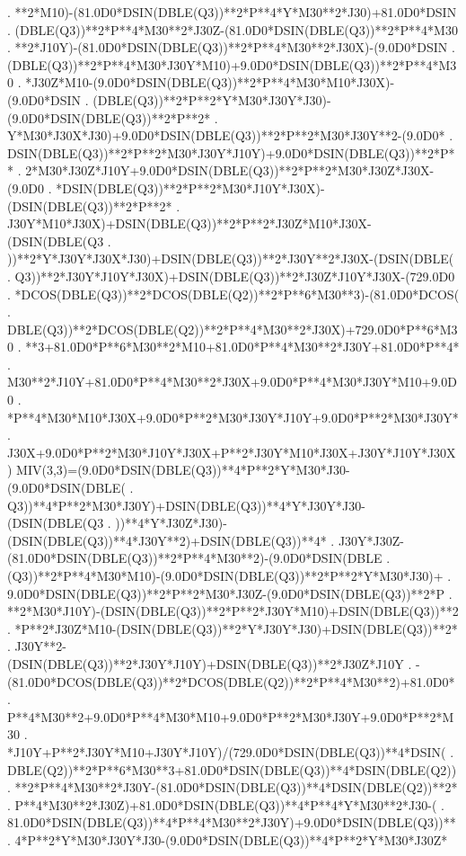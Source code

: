 \begin{framedverbatim}
     . **2*M10)-(81.0D0*DSIN(DBLE(Q3))**2*P**4*Y*M30**2*J30)+81.0D0*DSIN
     . (DBLE(Q3))**2*P**4*M30**2*J30Z-(81.0D0*DSIN(DBLE(Q3))**2*P**4*M30
     . **2*J10Y)-(81.0D0*DSIN(DBLE(Q3))**2*P**4*M30**2*J30X)-(9.0D0*DSIN
     . (DBLE(Q3))**2*P**4*M30*J30Y*M10)+9.0D0*DSIN(DBLE(Q3))**2*P**4*M30
     . *J30Z*M10-(9.0D0*DSIN(DBLE(Q3))**2*P**4*M30*M10*J30X)-(9.0D0*DSIN
     . (DBLE(Q3))**2*P**2*Y*M30*J30Y*J30)-(9.0D0*DSIN(DBLE(Q3))**2*P**2*
     . Y*M30*J30X*J30)+9.0D0*DSIN(DBLE(Q3))**2*P**2*M30*J30Y**2-(9.0D0*
     . DSIN(DBLE(Q3))**2*P**2*M30*J30Y*J10Y)+9.0D0*DSIN(DBLE(Q3))**2*P**
     . 2*M30*J30Z*J10Y+9.0D0*DSIN(DBLE(Q3))**2*P**2*M30*J30Z*J30X-(9.0D0
     . *DSIN(DBLE(Q3))**2*P**2*M30*J10Y*J30X)-(DSIN(DBLE(Q3))**2*P**2*
     . J30Y*M10*J30X)+DSIN(DBLE(Q3))**2*P**2*J30Z*M10*J30X-(DSIN(DBLE(Q3
     . ))**2*Y*J30Y*J30X*J30)+DSIN(DBLE(Q3))**2*J30Y**2*J30X-(DSIN(DBLE(
     . Q3))**2*J30Y*J10Y*J30X)+DSIN(DBLE(Q3))**2*J30Z*J10Y*J30X-(729.0D0
     . *DCOS(DBLE(Q3))**2*DCOS(DBLE(Q2))**2*P**6*M30**3)-(81.0D0*DCOS(
     . DBLE(Q3))**2*DCOS(DBLE(Q2))**2*P**4*M30**2*J30X)+729.0D0*P**6*M30
     . **3+81.0D0*P**6*M30**2*M10+81.0D0*P**4*M30**2*J30Y+81.0D0*P**4*
     . M30**2*J10Y+81.0D0*P**4*M30**2*J30X+9.0D0*P**4*M30*J30Y*M10+9.0D0
     . *P**4*M30*M10*J30X+9.0D0*P**2*M30*J30Y*J10Y+9.0D0*P**2*M30*J30Y*
     . J30X+9.0D0*P**2*M30*J10Y*J30X+P**2*J30Y*M10*J30X+J30Y*J10Y*J30X)
      MIV(3,3)=(9.0D0*DSIN(DBLE(Q3))**4*P**2*Y*M30*J30-(9.0D0*DSIN(DBLE(
     . Q3))**4*P**2*M30*J30Y)+DSIN(DBLE(Q3))**4*Y*J30Y*J30-(DSIN(DBLE(Q3
     . ))**4*Y*J30Z*J30)-(DSIN(DBLE(Q3))**4*J30Y**2)+DSIN(DBLE(Q3))**4*
     . J30Y*J30Z-(81.0D0*DSIN(DBLE(Q3))**2*P**4*M30**2)-(9.0D0*DSIN(DBLE
     . (Q3))**2*P**4*M30*M10)-(9.0D0*DSIN(DBLE(Q3))**2*P**2*Y*M30*J30)+
     . 9.0D0*DSIN(DBLE(Q3))**2*P**2*M30*J30Z-(9.0D0*DSIN(DBLE(Q3))**2*P
     . **2*M30*J10Y)-(DSIN(DBLE(Q3))**2*P**2*J30Y*M10)+DSIN(DBLE(Q3))**2
     . *P**2*J30Z*M10-(DSIN(DBLE(Q3))**2*Y*J30Y*J30)+DSIN(DBLE(Q3))**2*
     . J30Y**2-(DSIN(DBLE(Q3))**2*J30Y*J10Y)+DSIN(DBLE(Q3))**2*J30Z*J10Y
     . -(81.0D0*DCOS(DBLE(Q3))**2*DCOS(DBLE(Q2))**2*P**4*M30**2)+81.0D0*
     . P**4*M30**2+9.0D0*P**4*M30*M10+9.0D0*P**2*M30*J30Y+9.0D0*P**2*M30
     . *J10Y+P**2*J30Y*M10+J30Y*J10Y)/(729.0D0*DSIN(DBLE(Q3))**4*DSIN(
     . DBLE(Q2))**2*P**6*M30**3+81.0D0*DSIN(DBLE(Q3))**4*DSIN(DBLE(Q2))
     . **2*P**4*M30**2*J30Y-(81.0D0*DSIN(DBLE(Q3))**4*DSIN(DBLE(Q2))**2*
     . P**4*M30**2*J30Z)+81.0D0*DSIN(DBLE(Q3))**4*P**4*Y*M30**2*J30-(
     . 81.0D0*DSIN(DBLE(Q3))**4*P**4*M30**2*J30Y)+9.0D0*DSIN(DBLE(Q3))**
     . 4*P**2*Y*M30*J30Y*J30-(9.0D0*DSIN(DBLE(Q3))**4*P**2*Y*M30*J30Z*

\end{framedverbatim}
